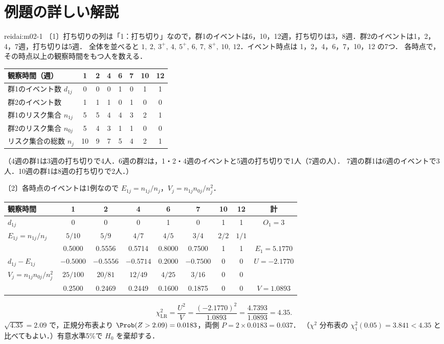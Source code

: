 \section{例題の詳しい解説}\label{sec:m02-kaisetsu}
\begin{kaitou}{reidai:m02-1}
〔1〕打ち切りの列は「1：打ち切り」なので，群1のイベントは6，10，12週，打ち切りは3，8週．群2のイベントは1，2，4，7週，打ち切りは5週．
全体を並べると $1,\ 2,\ 3^+,\ 4,\ 5^+,\ 6,\ 7,\ 8^+,\ 10,\ 12$．イベント時点は 1，2，4，6，7，10，12 の7つ．
各時点で，その時点以上の観察時間をもつ人を数える．
\begin{center}\small
\begin{tabular}{@{}lccccccc@{}}
\toprule
観察時間（週） & 1 & 2 & 4 & 6 & 7 & 10 & 12\\
\midrule
群1のイベント数 $d_{1j}$ & 0 & 0 & 0 & 1 & 0 & 1 & 1\\
群2のイベント数 & 1 & 1 & 1 & 0 & 1 & 0 & 0\\
群1のリスク集合 $n_{1j}$ & 5 & 5 & 4 & 4 & 3 & 2 & 1\\
群2のリスク集合 $n_{0j}$ & 5 & 4 & 3 & 1 & 1 & 0 & 0\\
リスク集合の総数 $n_j$ & 10 & 9 & 7 & 5 & 4 & 2 & 1\\
\bottomrule
\end{tabular}
\end{center}
（4週の群1は3週の打ち切りで4人．6週の群2は，1・2・4週のイベントと5週の打ち切りで1人（7週の人）．
7週の群1は6週のイベントで3人．10週の群1は8週の打ち切りで2人．）

〔2〕各時点のイベントは1例なので $E_{1j}=n_{1j}/n_j$，$V_j=n_{1j}n_{0j}/n_j^2$．
\begin{center}\small
\begin{tabular}{@{}lcccccccc@{}}
\toprule
観察時間 & 1 & 2 & 4 & 6 & 7 & 10 & 12 & 計\\
\midrule
$d_{1j}$ & 0 & 0 & 0 & 1 & 0 & 1 & 1 & $O_1=3$\\
$E_{1j}=n_{1j}/n_j$ & $5/10$ & $5/9$ & $4/7$ & $4/5$ & $3/4$ & $2/2$ & $1/1$ & \\
 & 0.5000 & 0.5556 & 0.5714 & 0.8000 & 0.7500 & 1 & 1 & $E_1=5.1770$\\
$d_{1j}-E_{1j}$ & $-0.5000$ & $-0.5556$ & $-0.5714$ & $0.2000$ & $-0.7500$ & 0 & 0 & $U=-2.1770$\\
$V_j=n_{1j}n_{0j}/n_j^2$ & $25/100$ & $20/81$ & $12/49$ & $4/25$ & $3/16$ & 0 & 0 & \\
 & 0.2500 & 0.2469 & 0.2449 & 0.1600 & 0.1875 & 0 & 0 & $V=1.0893$\\
\bottomrule
\end{tabular}
\end{center}
\[
\chi^2_{\mathrm{LR}}=\frac{U^2}{V}=\frac{(-2.1770)^2}{1.0893}=\frac{4.7393}{1.0893}=4.35 .
\]
$\sqrt{4.35}=2.09$ で，正規分布表より $\Prob(Z>2.09)=0.0183$，両側 $P=2\times0.0183=0.037$．
（$\chi^2$ 分布表の $\chi^2_1(0.05)=3.841<4.35$ と比べてもよい．）有意水準5\%で $H_0$ を棄却する．


\end{kaitou}
